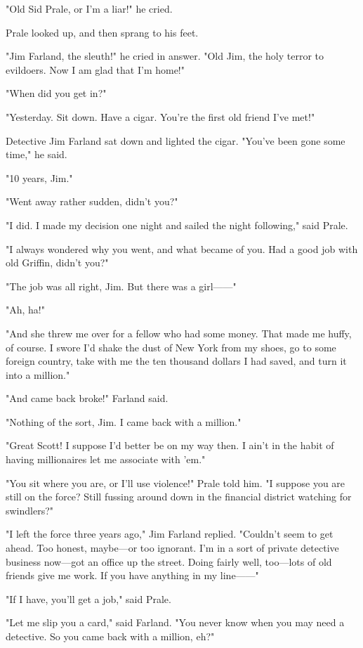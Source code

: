 \documentclass{novel}
\begin{document}
"Old Sid Prale, or I'm a liar!" he cried.

Prale looked up, and then sprang to his feet.

"Jim Farland, the sleuth!" he cried in answer. "Old Jim, the holy terror to evildoers. Now I am glad that I'm home!"

"When did you get in?"

"Yesterday. Sit down. Have a cigar. You're the first old friend I've met!"

Detective Jim Farland sat down and lighted the cigar. "You've been gone some time," he said.

"10 years, Jim."

"Went away rather sudden, didn't you?"

"I did. I made my decision one night and sailed the night following," said Prale.

"I always wondered why you went, and what became of you. Had a good job with old Griffin, didn't you?"

"The job was all right, Jim. But there was a girl------"

"Ah, ha!"

"And she threw me over for a fellow who had some money. That made me huffy, of course. I swore I'd shake the dust of New York from my shoes, go to some foreign country, take with me the ten thousand dollars I had saved, and turn it into a million."

"And came back broke!" Farland said.

"Nothing of the sort, Jim. I came back with a million."

"Great Scott! I suppose I'd better be on my way then. I ain't in the habit of having millionaires let me associate with 'em."

"You sit where you are, or I'll use violence!" Prale told him. "I suppose you are still on the force? Still fussing around down in the financial district watching for swindlers?"

"I left the force three years ago," Jim Farland replied. "Couldn't seem to get ahead. Too honest, maybe---or too ignorant. I'm in a sort of private detective business now---got an office up the street. Doing fairly well, too---lots of old friends give me work. If you have anything in my line------"

"If I have, you'll get a job," said Prale.

"Let me slip you a card," said Farland. "You never know when you may need a detective. So you came back with a million, eh?"
\end{document}
